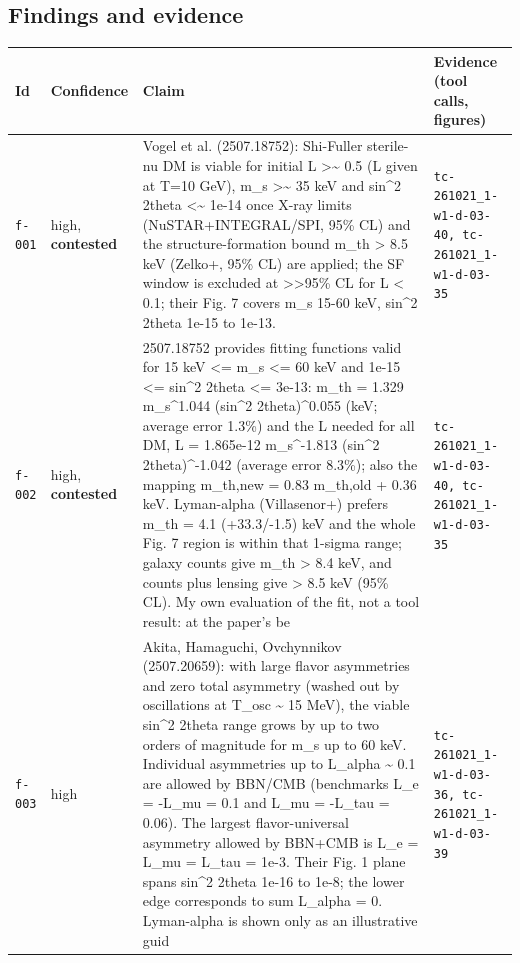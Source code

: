 \documentclass[11pt,a4paper]{article}
\begin{document}
\subsection{Findings and evidence}
\begin{longtable}{@{}p{}p{}p{}p{}@{}}
\toprule Id & Confidence & Claim & Evidence (tool calls, figures) \\ \midrule \endhead
\texttt{f-001} & high, \textbf{contested} & Vogel et al. (2507.18752): Shi-Fuller sterile-nu DM is viable for initial L \textgreater{}\textasciitilde{} 0.5 (L given at T=10 GeV), m\_s \textgreater{}\textasciitilde{} 35 keV and sin\textasciicircum{}2 2theta \textless{}\textasciitilde{} 1e-14 once X-ray limits (NuSTAR+INTEGRAL/SPI, 95\% CL) and the structure-formation bound m\_th \textgreater{} 8.5 keV (Zelko+, 95\% CL) are applied; the SF window is excluded at \textgreater{}\textgreater{}95\% CL for L \textless{} 0.1; their Fig. 7 covers m\_s 15-60 keV, sin\textasciicircum{}2 2theta 1e-15 to 1e-13. & \texttt{tc-261021\_\allowbreak{}1-w1-d-03-40,\allowbreak{} tc-261021\_\allowbreak{}1-w1-d-03-35} \\
\texttt{f-002} & high, \textbf{contested} & 2507.18752 provides fitting functions valid for 15 keV \textless{}= m\_s \textless{}= 60 keV and 1e-15 \textless{}= sin\textasciicircum{}2 2theta \textless{}= 3e-13: m\_th = 1.329 m\_s\textasciicircum{}1.044 (sin\textasciicircum{}2 2theta)\textasciicircum{}0.055 (keV; average error 1.3\%) and the L needed for all DM, L = 1.865e-12 m\_s\textasciicircum{}-1.813 (sin\textasciicircum{}2 2theta)\textasciicircum{}-1.042 (average error 8.3\%); also the mapping m\_th,new = 0.83 m\_th,old + 0.36 keV. Lyman-alpha (Villasenor+) prefers m\_th = 4.1 (+33.3/-1.5) keV and the whole Fig. 7 region is within that 1-sigma range; galaxy counts give m\_th \textgreater{} 8.4 keV, and counts plus lensing give \textgreater{} 8.5 keV (95\% CL). My own evaluation of the fit, not a tool result: at the paper's be & \texttt{tc-261021\_\allowbreak{}1-w1-d-03-40,\allowbreak{} tc-261021\_\allowbreak{}1-w1-d-03-35} \\
\texttt{f-003} & high & Akita, Hamaguchi, Ovchynnikov (2507.20659): with large flavor asymmetries and zero total asymmetry (washed out by oscillations at T\_osc \textasciitilde{} 15 MeV), the viable sin\textasciicircum{}2 2theta range grows by up to two orders of magnitude for m\_s up to 60 keV. Individual asymmetries up to \textbar{}L\_alpha\textbar{} \textasciitilde{} 0.1 are allowed by BBN/CMB (benchmarks L\_e = -L\_mu = 0.1 and L\_mu = -L\_tau = 0.06). The largest flavor-universal asymmetry allowed by BBN+CMB is L\_e = L\_mu = L\_tau = 1e-3. Their Fig. 1 plane spans sin\textasciicircum{}2 2theta 1e-16 to 1e-8; the lower edge corresponds to sum L\_alpha = 0. Lyman-alpha is shown only as an illustrative guid & \texttt{tc-261021\_\allowbreak{}1-w1-d-03-36,\allowbreak{} tc-261021\_\allowbreak{}1-w1-d-03-39} \\

\end{longtable}
\end{document}

